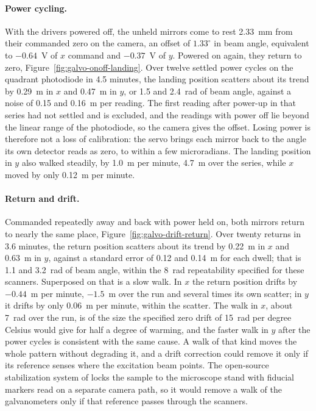 \documentclass{article}
\begin{document}
\paragraph{Power cycling.}
With the drivers powered off, the unheld mirrors come to rest 2.33~mm from their commanded zero on
the camera, an offset of $1.33^\circ$ in beam angle, equivalent to $-0.64$~V of $x$ command and
$-0.37$~V of $y$. Powered on again, they return to zero, Figure~\ref{fig:galvo-onoff-landing}. Over
twelve settled power cycles on the quadrant photodiode in 4.5 minutes, the landing position scatters
about its trend by 0.29~\textmu m in $x$ and 0.47~\textmu m in $y$, or 1.5 and 2.4~\textmu rad of
beam angle, against a noise of 0.15 and 0.16~\textmu m per reading. The first reading after power-up
in that series had not settled and is excluded, and the readings with power off lie beyond the
linear range of the photodiode, so the camera gives the offset. Losing power is therefore not a loss
of calibration: the servo brings each mirror back to the angle its own detector reads as zero, to
within a few microradians. The landing position in $y$ also walked steadily, by 1.0~\textmu m per
minute, 4.7~\textmu m over the series, while $x$ moved by only 0.12~\textmu m per minute.

\paragraph{Return and drift.}
Commanded repeatedly away and back with power held on, both mirrors return to nearly the same place,
Figure~\ref{fig:galvo-drift-return}. Over twenty returns in 3.6 minutes, the return position
scatters about its trend by 0.22~\textmu m in $x$ and 0.63~\textmu m in $y$, against a standard
error of 0.12 and 0.14~\textmu m for each dwell; that is 1.1 and 3.2~\textmu rad of beam angle,
within the 8~\textmu rad repeatability specified for these scanners. Superposed on that is a slow
walk. In $x$ the return position drifts by $-0.44$~\textmu m per minute, $-1.5$~\textmu m over the
run and several times its own scatter; in $y$ it drifts by only 0.06~\textmu m per minute, within
the scatter. The walk in $x$, about 7~\textmu rad over the run, is of the size the specified zero
drift of 15~\textmu rad per degree Celsius would give for half a degree of warming, and the faster
walk in $y$ after the power cycles is consistent with the same cause. A walk of that kind moves the
whole pattern without degrading it, and a drift correction could remove it only if its reference
senses where the excitation beam points. The open-source stabilization system of
\cite{lopezOpensourceSubNanometerStabilization2025} locks the sample to the microscope stand with
fiducial markers read on a separate camera path, so it would remove a walk of the galvanometers
only if that reference passes through the scanners.
\end{document}
